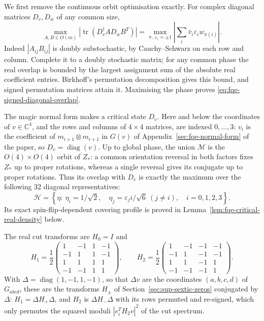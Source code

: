 We first remove the continuous orbit optimisation exactly.
For complex diagonal matrices $D_v,D_w$ of any common size,
\begin{equation}\label{eq:fqe-signed-diagonal-overlap}
 \max_{A,B\in O(m)}|\operatorname{tr}(D_v^\dagger A D_wB^T)|
 =\max_{\pi,\,\varepsilon_i=\pm1}
                  \left|\sum_i\bar v_i\varepsilon_iw_{\pi(i)}\right|.
\end{equation}
Indeed $|A_{ij}B_{ij}|$ is doubly substochastic, by Cauchy--Schwarz
on each row and column. Complete it to a doubly stochastic matrix;
for any common phase the real overlap is bounded by the largest
assignment sum of the absolute real coefficient entries. Birkhoff's
permutation decomposition gives this bound, and signed permutation
matrices attain it. Maximising the phase proves
\eqref{eq:fqe-signed-diagonal-overlap}.

The magic normal form makes a critical state $D_v$. Here and below the coordinates of $v\in\mathbb C^4$, and the
rows and columns of $4\times4$ matrices, are indexed $0,\dots,3$: $v_i$ is the coefficient of $m_{i+1}\otimes m_{i+1}$ in
$G(v)$ of Appendix~\ref{sec:fqe-normal-form} of the paper, so $D_v=\operatorname{diag}(v)$.
Up to global phase, the union $\mathcal M$ is the $O(4)\times O(4)$ orbit
of $Z_*$: a common orientation reversal in both factors fixes $Z_*$
up to proper rotations, whereas a single reversal gives its conjugate
up to proper rotations. Thus its overlap with $D_v$ is exactly the
maximum over the following 32 diagonal representatives:
\[
 \mathcal H=\left\{\eta:\ \eta_i=1/\sqrt2,\quad
         \eta_j=\varepsilon_j i/\sqrt6\ (j\ne i),\quad i=0,1,2,3\right\}.
\]
Its exact spin-flip-dependent covering profile is proved in
Lemma~\ref{lem:fqe-critical-real-density} below.

The real cut transforms are $H_0=I$ and
\[
 H_1=\frac12\begin{pmatrix}
 1&-1&1&-1\\-1&1&1&-1\\1&1&1&1\\-1&-1&1&1
 \end{pmatrix},\qquad
 H_2=\frac12\begin{pmatrix}
 1&-1&-1&-1\\-1&1&-1&-1\\1&1&-1&1\\-1&-1&-1&1
 \end{pmatrix}.
\]
With $\Delta=\operatorname{diag}(1,-1,1,-1)$, so that $\Delta v$ are the coordinates $(a,b,c,d)$ of $G_{abcd}$, these are
the transforms $H_\pm$ of Section~\ref{sec:sup-sextic-zeros} conjugated by $\Delta$: $H_1=\Delta H_+\Delta$, and $H_2$
is $\Delta H_-\Delta$ with its rows permuted and re-signed, which only permutes the squared moduli $|e_i^TH_2v|^2$ of the cut spectrum.

